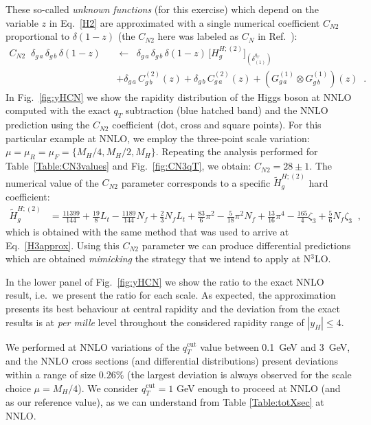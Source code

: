 \documentclass[12pt]{article}
\def\beeq{\begin{eqnarray}}
\def\eeeq{\end{eqnarray}}
\def\nn{\nonumber}
\newcommand\f[2]{\frac{#1}{#2}}
\DeclareRobustCommand{\qt}{q_T}
\DeclareRobustCommand{\qtcut}{\ensuremath{q_T^\mathrm{cut}}}
\begin{document}
These so-called \textit{unknown functions} (for this exercise) which depend on the variable $z$ in Eq.~\eqref{H2} are approximated with a single numerical coefficient $C_{N2}$ proportional to $\delta(1-z)$ (the $C_{N2}$ here was labeled as $C_{N}$ in Ref.~\cite{Bozzi:2005wk}):
\beeq
\label{CNeq}
C_{N2}\;\;\delta_{g\,a} \,\delta_{g\,b} \,\delta(1-z) && \!\!\!\!\!\! \leftarrow\;\; \delta_{g\,a} \,\delta_{g\,b} \,\delta(1-z)
\, \big[H^{H;(2)}_{g}\big]_{(\delta^{\qt}_{(1)})}\nn\\
&&+\delta_{g\,a} \,C^{(2)}_{g\,b}(z)+\delta_{g\,b} \,C^{(2)}_{g\,a}(z)+
\left(G^{(1)}_{g\,a}\otimes G^{(1)}_{g\,b}\right)(z)\;\; .
\eeeq 
In Fig.~\ref{fig:yHCN} we show the rapidity distribution of the Higgs boson at NNLO computed with the exact $\qt$ subtraction (blue hatched band) and the NNLO prediction using the $C_{N2}$ coefficient (dot, cross and square points). For this particular example at NNLO, we employ the three-point scale variation: $\mu=\mu_{R}=\mu_{F}=\{M_{H}/4,M_{H}/2,M_{H}\}$. Repeating the analysis performed for Table~\ref{Table:CN3values} and Fig.~\ref{fig:CN3qT}, we obtain: $C_{N2}=28\pm 1$. The numerical value of the $C_{N2}$ parameter corresponds to a specific $\widetilde{H}^{H;(2)}_{g}$ hard coefficient:
\begin{align}
\label{Ht2g}
\widetilde{H}^{H;(2)}_{g}&=\f{11399}{144}+\f{19}{8} L_{t}-\f{1189}{144} N_{f}+\f{2}{3} N_{f} L_{t}+\f{83}{6} \pi^{2} -\f{5}{18} \pi^{2} N_{f} + \f{13}{16} \pi^{4} - \f{165}{4} \zeta_{3} + \f{5}{6} N_{f} \zeta_{3}\;\;,
\end{align}
which is obtained with the same method that was used to arrive at Eq.~\eqref{H3approx}.
Using this $C_{N2}$ parameter we can produce differential predictions which are obtained \textit{mimicking} the strategy that we intend to apply at N$^{3}$LO. 

In the lower panel of Fig.~\ref{fig:yHCN} we show the ratio to the exact NNLO result, i.e.\ we present the ratio for each scale. As expected, the approximation presents its best behaviour at central rapidity and the deviation from the exact results is at \textit{per mille} level throughout the considered rapidity range of $|y_{H}|\leq 4$.

We performed at NNLO variations of the $\qtcut$ value between 0.1~GeV and 3~GeV, and the NNLO cross sections (and differential distributions) present deviations within a range of size $0.26\%$  (the largest deviation is always observed for the scale choice $\mu=M_{H}/4$).  We consider $\qtcut=1$ GeV enough to proceed at NNLO (and as our reference value), as we can understand from Table \ref{Table:totXsec} at NNLO.
\end{document}
